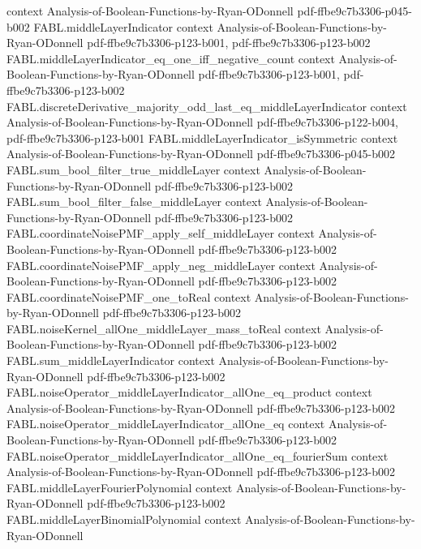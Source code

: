 \begin{theorem}
  {context}
  {Analysis-of-Boolean-Functions-by-Ryan-ODonnell}
  {pdf-ffbe9c7b3306-p045-b002}
\proofstep
  {FABL.middleLayerIndicator}
  {context}
  {Analysis-of-Boolean-Functions-by-Ryan-ODonnell}
  {pdf-ffbe9c7b3306-p123-b001,
    pdf-ffbe9c7b3306-p123-b002}
\proofstep
  {FABL.middleLayerIndicator_eq_one_iff_negative_count}
  {context}
  {Analysis-of-Boolean-Functions-by-Ryan-ODonnell}
  {pdf-ffbe9c7b3306-p123-b001,
    pdf-ffbe9c7b3306-p123-b002}
\proofstep
  {FABL.discreteDerivative_majority_odd_last_eq_middleLayerIndicator}
  {context}
  {Analysis-of-Boolean-Functions-by-Ryan-ODonnell}
  {pdf-ffbe9c7b3306-p122-b004,
    pdf-ffbe9c7b3306-p123-b001}
\proofstep
  {FABL.middleLayerIndicator_isSymmetric}
  {context}
  {Analysis-of-Boolean-Functions-by-Ryan-ODonnell}
  {pdf-ffbe9c7b3306-p045-b002}
\proofstep
  {FABL.sum_bool_filter_true_middleLayer}
  {context}
  {Analysis-of-Boolean-Functions-by-Ryan-ODonnell}
  {pdf-ffbe9c7b3306-p123-b002}
\proofstep
  {FABL.sum_bool_filter_false_middleLayer}
  {context}
  {Analysis-of-Boolean-Functions-by-Ryan-ODonnell}
  {pdf-ffbe9c7b3306-p123-b002}
\proofstep
  {FABL.coordinateNoisePMF_apply_self_middleLayer}
  {context}
  {Analysis-of-Boolean-Functions-by-Ryan-ODonnell}
  {pdf-ffbe9c7b3306-p123-b002}
\proofstep
  {FABL.coordinateNoisePMF_apply_neg_middleLayer}
  {context}
  {Analysis-of-Boolean-Functions-by-Ryan-ODonnell}
  {pdf-ffbe9c7b3306-p123-b002}
\proofstep
  {FABL.coordinateNoisePMF_one_toReal}
  {context}
  {Analysis-of-Boolean-Functions-by-Ryan-ODonnell}
  {pdf-ffbe9c7b3306-p123-b002}
\proofstep
  {FABL.noiseKernel_allOne_middleLayer_mass_toReal}
  {context}
  {Analysis-of-Boolean-Functions-by-Ryan-ODonnell}
  {pdf-ffbe9c7b3306-p123-b002}
\proofstep
  {FABL.sum_middleLayerIndicator}
  {context}
  {Analysis-of-Boolean-Functions-by-Ryan-ODonnell}
  {pdf-ffbe9c7b3306-p123-b002}
\proofstep
  {FABL.noiseOperator_middleLayerIndicator_allOne_eq_product}
  {context}
  {Analysis-of-Boolean-Functions-by-Ryan-ODonnell}
  {pdf-ffbe9c7b3306-p123-b002}
\proofstep
  {FABL.noiseOperator_middleLayerIndicator_allOne_eq}
  {context}
  {Analysis-of-Boolean-Functions-by-Ryan-ODonnell}
  {pdf-ffbe9c7b3306-p123-b002}
\proofstep
  {FABL.noiseOperator_middleLayerIndicator_allOne_eq_fourierSum}
  {context}
  {Analysis-of-Boolean-Functions-by-Ryan-ODonnell}
  {pdf-ffbe9c7b3306-p123-b002}
\proofstep
  {FABL.middleLayerFourierPolynomial}
  {context}
  {Analysis-of-Boolean-Functions-by-Ryan-ODonnell}
  {pdf-ffbe9c7b3306-p123-b002}
\proofstep
  {FABL.middleLayerBinomialPolynomial}
  {context}
  {Analysis-of-Boolean-Functions-by-Ryan-ODonnell}

\end{theorem}
